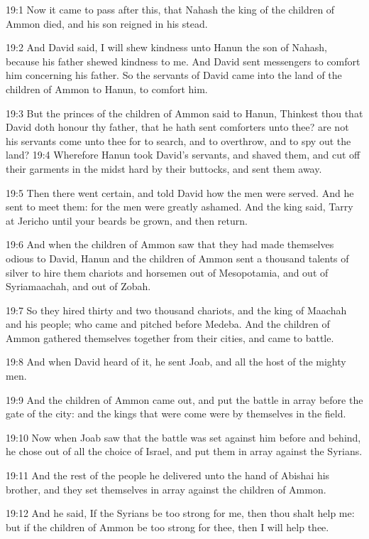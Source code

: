 19:1 Now it came to pass after this, that Nahash the king of the
children of Ammon died, and his son reigned in his stead.

19:2 And David said, I will shew kindness unto Hanun the son of
Nahash, because his father shewed kindness to me. And David sent
messengers to comfort him concerning his father. So the servants of
David came into the land of the children of Ammon to Hanun, to comfort
him.

19:3 But the princes of the children of Ammon said to Hanun, Thinkest
thou that David doth honour thy father, that he hath sent comforters
unto thee?  are not his servants come unto thee for to search, and to
overthrow, and to spy out the land?  19:4 Wherefore Hanun took David's
servants, and shaved them, and cut off their garments in the midst
hard by their buttocks, and sent them away.

19:5 Then there went certain, and told David how the men were served.
And he sent to meet them: for the men were greatly ashamed. And the
king said, Tarry at Jericho until your beards be grown, and then
return.

19:6 And when the children of Ammon saw that they had made themselves
odious to David, Hanun and the children of Ammon sent a thousand
talents of silver to hire them chariots and horsemen out of
Mesopotamia, and out of Syriamaachah, and out of Zobah.

19:7 So they hired thirty and two thousand chariots, and the king of
Maachah and his people; who came and pitched before Medeba. And the
children of Ammon gathered themselves together from their cities, and
came to battle.

19:8 And when David heard of it, he sent Joab, and all the host of the
mighty men.

19:9 And the children of Ammon came out, and put the battle in array
before the gate of the city: and the kings that were come were by
themselves in the field.

19:10 Now when Joab saw that the battle was set against him before and
behind, he chose out of all the choice of Israel, and put them in
array against the Syrians.

19:11 And the rest of the people he delivered unto the hand of Abishai
his brother, and they set themselves in array against the children of
Ammon.

19:12 And he said, If the Syrians be too strong for me, then thou
shalt help me: but if the children of Ammon be too strong for thee,
then I will help thee.

